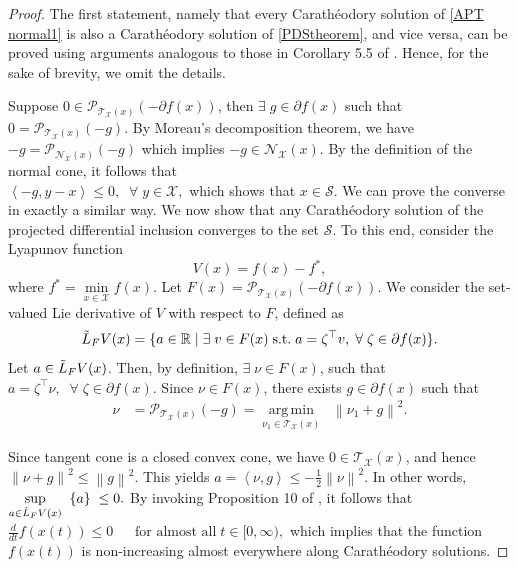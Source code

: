 \documentclass[9pt,journal,twoside,web]{ieeecolor}
\newcommand{\norm}[1]{\left\lVert #1 \right\rVert}
\newcommand{\inprod}[2]{\left\langle #1, #2 \right\rangle}
\DeclareMathOperator*{\argmin}{arg\,min}
\begin{document}
\begin{proof}
\color{black}
The first statement, namely that every Carath\'eodory solution of \eqref{APT normal1} is also a Carath\'eodory solution of \eqref{PDStheorem}, and vice versa, can be proved using arguments analogous to those in Corollary 5.5 of \cite{Doffler}. Hence, for the sake of brevity, we omit the details.
\color{black}

    Suppose  $ 0 \in \mathcal{P}_{\mathcal{T}_\mathcal{X}(x)} (- \partial f(x))$, then $\exists \; g \in \partial f(x) $ such that $ 0 = \mathcal{P}_{\mathcal{T}_\mathcal{X}(x)} (- g)$. 
   By Moreau’s decomposition theorem, we have  $ -g = \mathcal{P}_{\mathcal{N}_\mathcal{X}(x)} (- g)$
which implies $- g \in \mathcal{N}_\mathcal{X}(x)$. 
By the definition of the normal cone, it follows that
\\ $ \inprod{- g}{y-x} \leq 0, \; \;  \forall \; y \in \mathcal{X}, $
which shows that $x \in \mathcal{S}$. We can prove the converse in exactly a similar way. 
We now show that any Carathéodory solution of the projected differential inclusion converges to the set $\mathcal{S}$. To this end, consider the Lyapunov function
\begin{equation*}
    V(x) = f(x)  - f^\ast,
\end{equation*}
where $f^\ast = \min\limits_{x \in \mathcal{X}} f(x)$. Let $  F(x) = \mathcal{P}_{\mathcal{T}_\mathcal{X}(x)} (- \partial f(x)).$
We consider the set-valued Lie derivative of 
$V$ with respect to $F$, defined as 
 \begin{equation*}
        \Tilde{L}_F V(x) = \{a \in \mathbb{R} \;  | \;  \exists \;  v \in F(x) \;  \text{s.t.} \;  a = \zeta^\top v, \;  \forall \; \zeta \in \partial f(x) \}.
    \end{equation*}
    Let $a \in   \Tilde{L}_F V(x)$. Then, by definition,  $\exists \; \nu \in F(x)$, such that 
    $   a = \zeta^\top \nu, \; \; \forall \; \zeta \in \partial f(x)$.
    Since $\nu \in F(x)$,  there exists $g \in \partial f(x)$ such that 
    \begin{equation*}
    \begin{split}
         \nu & = \mathcal{P}_{\mathcal{T}_\mathcal{X}(x)} (-g)
          = \argmin\limits_{\nu_1 \in \mathcal{T}_\mathcal{X}(x)} \; \; \norm{\nu_1+ g}^2.
         \end{split}
    \end{equation*}

Since tangent cone is a closed convex cone, we have $0 \in \mathcal{T}_\mathcal{X}(x)$, and hence
$  \norm{\nu + g}^2 \leq \norm{g}^2.$
This yields $a = \inprod{\nu}{g} \leq - \frac{1}{2} \norm{\nu}^2.$
In other words, $ \sup\limits_{a \in \Tilde{L}_F V(x)}  \; \; \{a \}  \; \leq 0.$
By invoking Proposition 10 of \cite{Cortes}, it follows that $  \frac{d}{dt} f(x(t)) \leq 0 \; \; \quad \text{for almost all} \; t \in [0,\infty),$
which implies that the function 
$f(x(t))$ is non-increasing almost everywhere along Carathéodory solutions.


\end{proof}
\end{document}
